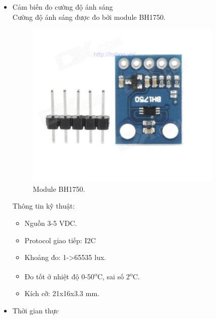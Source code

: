 \documentclass[a4paper,12pt,oneside]{article}
\begin{document}
\begin{itemize}
\item Cảm biến đo cường độ ánh sáng\\
\noindent Cường độ ánh sáng được đo bởi module BH1750.
\begin{figure}[h!]
\centering
\includegraphics[scale=.8]{hinh/BH175.png}
\caption{Module BH1750.}
\end{figure}

\noindent Thông tin kỹ thuật:
\begin{itemize}
\item Nguồn 3-5 VDC.
\item Protocol giao tiếp: I2C
\item Khoảng đo: 1->65535 lux.
\item Đo tốt ở nhiệt độ 0-50\textsuperscript{o}C, sai số 2\textsuperscript{o}C.
\item Kích cỡ: 21x16x3.3 mm.
\end{itemize}

\item Thời gian thực


\end{itemize}
\end{document}
